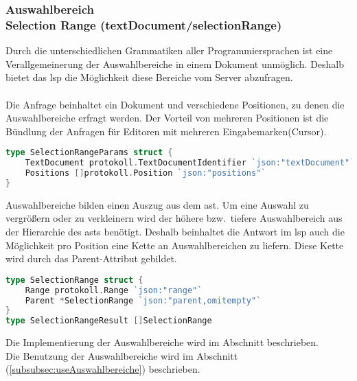 \documentclass[./einleitung.tex]{subfiles}
\begin{document}
    \subsubsection[Auswahlbereich]{Auswahlbereich\\ {\textnormal{\footnotesize Selection Range (textDocument/selectionRange) \cite{selection}}}}\label{subsubsec:selection}
    Durch die unterschiedlichen Grammatiken aller Programmiersprachen ist eine Verallgemeinerung der Auswahlbereiche in einem Dokument unmöglich.
    Deshalb bietet das \acrshort{lsp} die Möglichkeit diese Bereiche vom Server abzufragen.
    \\\\
    Die Anfrage beinhaltet ein Dokument und verschiedene Positionen, zu denen die Auswahlbereiche erfragt werden.
    Der Vorteil von mehreren Positionen ist die Bündlung der Anfragen für Editoren mit mehreren Eingabemarken(Cursor).
    \begin{lstlisting}[language=Go, title=Auszug aus den Parametern, label=lst:selectionParams]
type SelectionRangeParams struct {
	TextDocument protokoll.TextDocumentIdentifier `json:"textDocument"`
	Positions []protokoll.Position `json:"positions"`
}
    \end{lstlisting}
    Auswahlbereiche bilden einen Auszug aus dem \acrshort{ast}.
    Um eine Auswahl zu vergrößern oder zu verkleinern wird der höhere bzw.\ tiefere Auswahlbereich aus der Hierarchie des \acrshort{ast}s benötigt.
    Deshalb beinhaltet die Antwort im \acrshort{lsp} auch die Möglichkeit pro Position eine Kette an Auswahlbereichen zu liefern.
    Diese Kette wird durch das Parent-Attribut gebildet.
    \begin{lstlisting}[language=Go, title=Antwort des Servers, label=lst:selectionResult]
type SelectionRange struct {
	Range protokoll.Range `json:"range"`
	Parent *SelectionRange `json:"parent,omitempty"`
}
type SelectionRangeResult []SelectionRange
    \end{lstlisting}
    Die Implementierung der Auswahlbereiche wird im Abschnitt  beschrieben.\\
    Die Benutzung der Auswahlbereiche wird im Abschnitt  (\ref{subsubsec:useAuswahlbereiche}) beschrieben.
\end{document}
